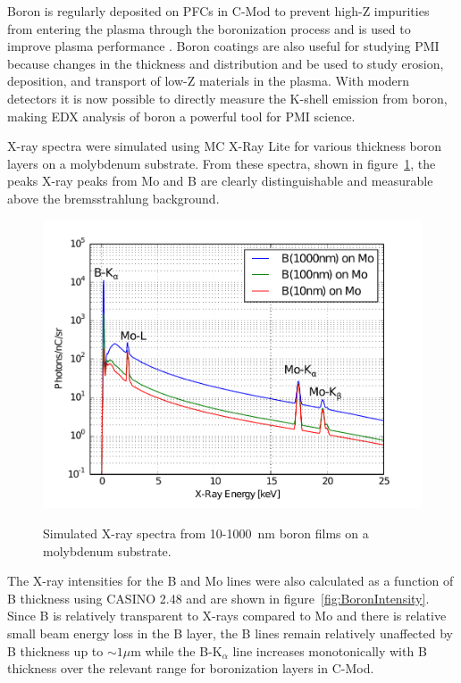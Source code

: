 \documentclass[12pt,letterpaper,final]{article}
\begin{document}
Boron is regularly deposited on PFCs in C-Mod to prevent high-Z impurities from entering the plasma through the boronization process and is used to improve plasma performance \cite{Boronization}. Boron coatings are also useful for studying PMI because changes in the thickness and distribution and be used to study erosion, deposition, and transport of low-Z materials in the plasma. With modern detectors it is now possible to directly measure the K-shell emission from boron, making EDX analysis of boron a powerful tool for PMI science.

X-ray spectra were simulated using MC X-Ray Lite \cite{MCXRayLite} for various thickness boron layers on a molybdenum substrate. From these spectra, shown in figure~\ref{fig:BoronOnMoSpectrum}, the peaks X-ray peaks from Mo and B are clearly distinguishable and measurable above the bremsstrahlung background.

\begin{figure}[!h]
 \centering
  \includegraphics[width=\columnwidth]{figures/BoronOnMoSpectra.pdf}
 \label{fig:BoronOnMoSpectrum}
 \caption{Simulated X-ray spectra from 10-1000~nm boron films on a molybdenum substrate.}
\end{figure}

The X-ray intensities for the B and Mo lines were also calculated as a function of B thickness using CASINO 2.48 \cite{CASINO} and are shown in figure~\ref{fig:BoronIntensity}. Since B is relatively transparent to X-rays compared to Mo and there is relative small beam energy loss in the B layer, the B lines remain relatively unaffected by B thickness up to $\sim 1 \mu$m while the B-K$_\alpha$ line increases monotonically with B thickness over the relevant range for boronization layers in C-Mod.
\end{document}
